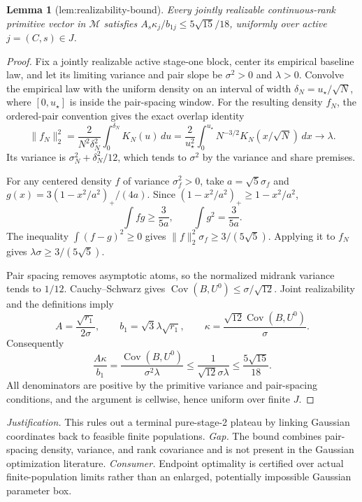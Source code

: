 \documentclass{article}
\newtheorem{lemma}{Lemma}
\begin{document}
\begin{lemma}[lem:realizability-bound]\label{lem:realizability-bound}
Every jointly realizable continuous-rank primitive vector in \(\mathcal{M}\) satisfies \(A_s\kappa_j/b_{1j}\le5\sqrt{15}/18\), uniformly over active \(j=(C,s)\in J\).
\end{lemma}
\begin{proof}
Fix a jointly realizable active stage-one block, center its empirical baseline law, and let its limiting variance and pair slope be \(\sigma^2>0\) and \(\lambda>0\).  Convolve the empirical law with the uniform density on an interval of width \(\delta_N=u_\star/\sqrt N\), where \([0,u_\star]\) is inside the pair-spacing window.  For the resulting density \(f_N\), the ordered-pair convention gives the exact overlap identity
\[
\|f_N\|_2^2
=\frac{2}{N^2\delta_N^2}\int_0^{\delta_N}K_N(u)\,du
=\frac{2}{u_\star^2}\int_0^{u_\star}N^{-3/2}K_N(x/\sqrt N)\,dx
\longrightarrow\lambda.
\]
Its variance is \(\sigma_N^2+\delta_N^2/12\), which tends to \(\sigma^2\) by the variance and share premises.

For any centered density \(f\) of variance \(\sigma_f^2>0\), take \(a=\sqrt5\sigma_f\) and \(g(x)=3(1-x^2/a^2)_+/(4a)\).  Since \((1-x^2/a^2)_+\ge1-x^2/a^2\),
\[
\int fg\ge\frac{3}{5a},
\qquad
\int g^2=\frac{3}{5a}.
\]
The inequality \(\int(f-g)^2\ge0\) gives \(\|f\|_2^2\sigma_f\ge3/(5\sqrt5)\).  Applying it to \(f_N\) gives \(\lambda\sigma\ge3/(5\sqrt5)\).

Pair spacing removes asymptotic atoms, so the normalized midrank variance tends to \(1/12\).  Cauchy--Schwarz gives \(\operatorname{Cov}(B,U^0)\le\sigma/\sqrt{12}\).  Joint realizability and the definitions imply
\[
A=\frac{\sqrt{r_1}}{2\sigma},\qquad
b_1=\sqrt3\lambda\sqrt{r_1},\qquad
\kappa=\frac{\sqrt{12}\operatorname{Cov}(B,U^0)}\sigma.
\]
Consequently
\[
\frac{A\kappa}{b_1}
=\frac{\operatorname{Cov}(B,U^0)}{\sigma^2\lambda}
\le\frac{1}{\sqrt{12}\sigma\lambda}
\le\frac{5\sqrt{15}}{18}.
\]
All denominators are positive by the primitive variance and pair-spacing conditions, and the argument is cellwise, hence uniform over finite \(J\).
\end{proof}
\par\smallskip\noindent \textit{Justification.} This rules out a terminal pure-stage-2 plateau by linking Gaussian coordinates back to feasible finite populations. \textit{Gap.} The bound combines pair-spacing density, variance, and rank covariance and is not present in the Gaussian optimization literature. \textit{Consumer.} Endpoint optimality is certified over actual finite-population limits rather than an enlarged, potentially impossible Gaussian parameter box.
\end{document}
